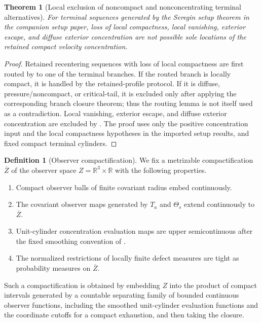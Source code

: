 \documentclass[11pt]{amsart}
\numberwithin{equation}{section}
\theoremstyle{plain}
\newtheorem{theorem}{Theorem}[section]
\theoremstyle{definition}
\newtheorem{definition}[definition]{Definition}
\theoremstyle{remark}
\begin{document}
\begin{theorem}[Local exclusion of noncompact and nonconcentrating terminal alternatives]
\label{thm:terminal-inactive-exclusion}
For terminal sequences generated by the Seregin setup theorem in
the companion setup paper, loss of local compactness, local vanishing,
exterior escape, and
diffuse exterior concentration are not possible sole locations of the retained
compact velocity concentration.
\end{theorem}

\begin{proof}
Retained recentering sequences with loss of local compactness are first routed
by  to one of the terminal
branches.  If the routed branch is locally compact, it is handled by the
retained-profile protocol.  If it is diffuse, pressure/noncompact, or
critical-tail, it is excluded only after applying the corresponding branch
closure theorem; thus the routing lemma is not itself used as a contradiction.
Local vanishing, exterior escape, and diffuse exterior concentration are
excluded by .  The proof uses only the
positive concentration input and the local compactness hypotheses in the
imported setup results, and fixed compact terminal cylinders.
\end{proof}

\begin{definition}[Observer compactification]
\label{def:observer-compactification}
We fix a metrizable compactification \(\overline Z\) of the observer space
\(Z=\mathbb R^3\times\mathbb R\) with the following properties.
\begin{enumerate}[label=\textup{(\roman*)}]
   \item Compact observer balls of finite covariant radius embed continuously.
   \item The covariant observer maps generated by \(T_a\) and \(\Theta_s\)
   extend continuously to \(\overline Z\).
   \item Unit-cylinder concentration evaluation maps are upper semicontinuous after
   the fixed smoothing convention of .
   \item The normalized restrictions of locally finite defect measures are
   tight as probability measures on \(\overline Z\).
\end{enumerate}
Such a compactification is obtained by embedding \(Z\) into the product of
compact intervals generated by a countable separating family of bounded
continuous observer functions, including the smoothed unit-cylinder evaluation
functions and the coordinate cutoffs for a compact exhaustion, and then taking
the closure.
\end{definition}
\end{document}
